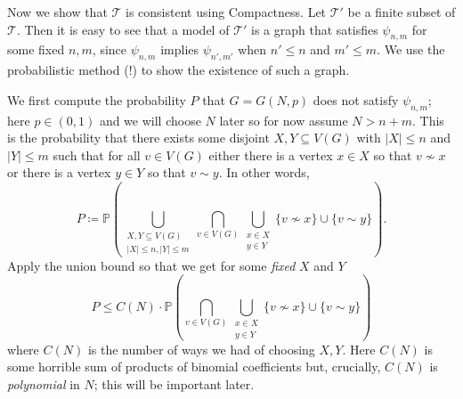 \documentclass{article}
\begin{document}
\begin{enumerate}[leftmargin=*]
		Now we show that $\mathcal{T}$ is consistent using Compactness. Let $\mathcal{T}'$ be a finite subset of $\mathcal{T}$. Then it is easy to see that a model of $\mathcal{T}'$ is a graph that satisfies $\psi_{n,m}$ for some fixed $n,m$, since $\psi_{n,m}$ implies $\psi_{n',m'}$ when $n'\leq n$ and $m'\leq m$. We use the probabilistic method (!) to show the existence of such a graph.
		
		We first compute the probability $P$ that $G = G(N,p)$ does not satisfy $\psi_{n,m}$; here $p\in (0,1)$ and we will choose $N$ later so for now assume $N> n+m$. This is the probability that there exists some disjoint $X,Y \subseteq V(G)$ with $|X|\leq n$ and $|Y| \leq m$ such that for all $v\in V(G)$ either there is a vertex $x\in X$ so that $v\nsim x$ or there is a vertex $y\in Y$ so that $v\sim y$. In other words,
		\[
			P \coloneqq \mathbb{P}\left(\bigcup_{\substack{X,Y\subseteq V(G)\\ |X|\leq n, |Y|\leq m}} \bigcap_{v\in V(G)} \bigcup_{\substack{x\in X \\ y\in Y}} \{v\nsim x\}\cup \{v\sim y\} \right).
		\]
		Apply the union bound so that we get for some \emph{fixed} $X$ and $Y$
		\[
			P \leq C(N)\cdot\mathbb{P}\left(\bigcap_{v\in V(G)} \bigcup_{\substack{x\in X \\ y\in Y}} \{v\nsim x\}\cup \{v\sim y\}\right)
		\]
		where $C(N)$ is the number of ways we had of choosing $X,Y$. Here $C(N)$ is some horrible sum of products of binomial coefficients but, crucially, $C(N)$ is \emph{polynomial} in $N$; this will be important later.
		

\end{enumerate}
\end{document}
